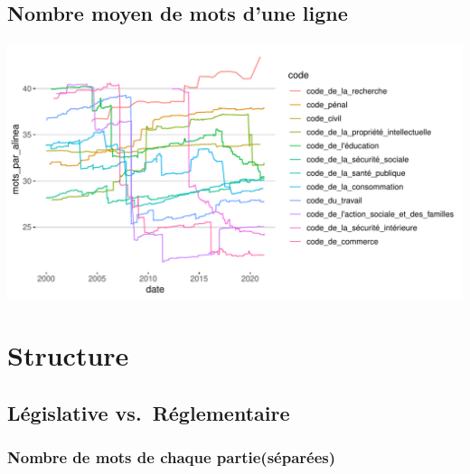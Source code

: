 \documentclass[
  oneside]{book}
\begin{document}
\hypertarget{nombre-moyen-de-mots-dune-ligne}{%
\subsection{Nombre moyen de mots d'une ligne}\label{nombre-moyen-de-mots-dune-ligne}}

\includegraphics{05-images_files/figure-latex/mots_par_alinea-1.pdf}

\hypertarget{structure}{%
\section{Structure}\label{structure}}

\hypertarget{luxe9gislative-vs.-ruxe9glementaire}{%
\subsection{Législative vs.~Réglementaire}\label{luxe9gislative-vs.-ruxe9glementaire}}

\hypertarget{nombre-de-mots-de-chaque-partiesuxe9paruxe9es}{%
\subsubsection{Nombre de mots de chaque partie(séparées)}\label{nombre-de-mots-de-chaque-partiesuxe9paruxe9es}}
\end{document}
